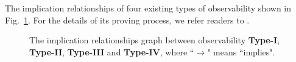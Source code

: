 The implication relationships of four existing types of observability shown in Fig.~\ref{fig:9}. For the details of its proving process, we refer readers to \cite{Zhang2016Observability}.

 \begin{figure}[thpb]
      \centering
      
      \caption{The implication relationships graph between observability {\bf Type-I}, {\bf Type-II}, {\bf Type-III} and {\bf Type-IV}, where ``$\rightarrow$" means ``implies".}
      \label{fig:9}
   \end{figure}

   

